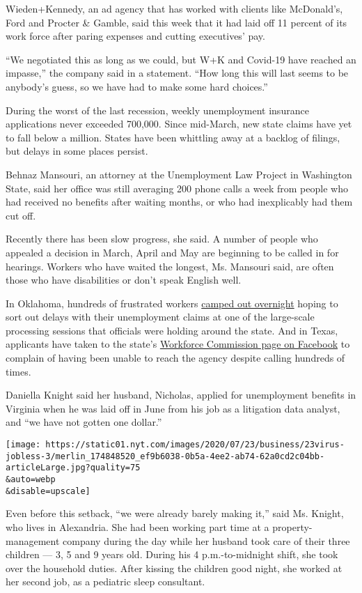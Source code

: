 Wieden+Kennedy, an ad agency that has worked with clients like
McDonald's, Ford and Procter \& Gamble, said this week that it had laid
off 11 percent of its work force after paring expenses and cutting
executives' pay.

``We negotiated this as long as we could, but W+K and Covid-19 have
reached an impasse,'' the company said in a statement. ``How long this
will last seems to be anybody's guess, so we have had to make some hard
choices.''

During the worst of the last recession, weekly unemployment insurance
applications never exceeded 700,000. Since mid-March, new state claims
have yet to fall below a million. States have been whittling away at a
backlog of filings, but delays in some places persist.

Behnaz Mansouri, an attorney at the Unemployment Law Project in
Washington State, said her office was still averaging 200 phone calls a
week from people who had received no benefits after waiting months, or
who had inexplicably had them cut off.

Recently there has been slow progress, she said. A number of people who
appealed a decision in March, April and May are beginning to be called
in for hearings. Workers who have waited the longest, Ms. Mansouri said,
are often those who have disabilities or don't speak English well.

In Oklahoma, hundreds of frustrated workers
\href{https://www.washingtonpost.com/national/a-very-dark-feeling-hundreds-camp-out-in-oklahoma-unemployment-lines/2020/07/20/44d59cb6-c77a-11ea-a99f-3bbdffb1af38_story.html}{camped
out overnight} hoping to sort out delays with their unemployment claims
at one of the large-scale processing sessions that officials were
holding around the state. And in Texas, applicants have taken to the
state's
\href{https://www.facebook.com/texasworkforcecommission/}{Workforce
Commission page on Facebook} to complain of having been unable to reach
the agency despite calling hundreds of times.

Daniella Knight said her husband, Nicholas, applied for unemployment
benefits in Virginia when he was laid off in June from his job as a
litigation data analyst, and ``we have not gotten one dollar.''

\texttt{[image: https://static01.nyt.com/images/2020/07/23/business/23virus-jobless-3/merlin\_174848520\_ef9b6038-0b5a-4ee2-ab74-62a0cd2c04bb-articleLarge.jpg?quality=75\\\&auto=webp\\\&disable=upscale]}

Even before this setback, ``we were already barely making it,'' said Ms.
Knight, who lives in Alexandria. She had been working part time at a
property-management company during the day while her husband took care
of their three children --- 3, 5 and 9 years old. During his 4
p.m.-to-midnight shift, she took over the household duties. After
kissing the children good night, she worked at her second job, as a
pediatric sleep consultant.

